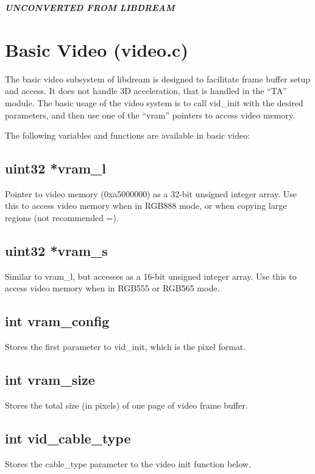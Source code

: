 \documentclass[english]{report}
\begin{document}
\textbf{\emph{UNCONVERTED FROM LIBDREAM}}


\section{Basic Video (video.c)}

The basic video subsystem of libdream is designed to facilitate frame
buffer setup and access. It does not handle 3D acceleration, that
is handled in the ``TA'' module. The basic usage of the video
system is to call vid\_init with the desired parameters, and then
use one of the ``vram'' pointers to access video memory.

The following variables and functions are available in basic video:


\subsection{uint32 *vram\_l}

Pointer to video memory (0xa5000000) as a 32-bit unsigned integer
array. Use this to access video memory when in RGB888 mode, or when
copying large regions (not recommended =).


\subsection{uint32 *vram\_s}

Similar to vram\_l, but accesses as a 16-bit unsigned integer array.
Use this to access video memory when in RGB555 or RGB565 mode.


\subsection{int vram\_config}

Stores the first parameter to vid\_init, which is the pixel format.


\subsection{int vram\_size}

Stores the total size (in pixels) of one page of video frame buffer.


\subsection{int vid\_cable\_type}

Stores the cable\_type parameter to the video init function below.
\end{document}
